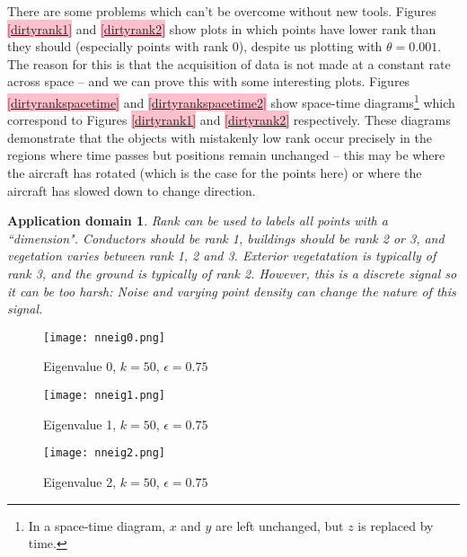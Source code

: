 \documentclass[a4paper,11pt,twoside]{article}
\newtheorem*{appdom}{Application domain}
\theoremstyle{definition}
\theoremstyle{remark}
\newcommand{\sh}[1]{\colorbox{pink}{#1}}
\newcommand{\lnk}[1]{\sh{\hyperref[#1]{\ref*{#1}}}}
\newenvironment{app}
   {\colorlet{shadecolor}{red!50}\begin{shaded}\begin{appdom}}
   {\end{appdom}\end{shaded}}
\begin{document}
There are some problems which can't be overcome without new tools. Figures \lnk{dirtyrank1} and \lnk{dirtyrank2} show plots in which points have lower rank than they should (especially points with rank $0$), despite us plotting with $\theta =0.001$. The reason for this is that the acquisition of data is not made at a constant rate across space -- and we can prove this with some interesting plots. Figures \lnk{dirtyrankspacetime} and \lnk{dirtyrankspacetime2} show space-time diagrams\footnote{In a space-time diagram, $x$ and $y$ are left unchanged, but $z$ is replaced by time.} which correspond to Figures \lnk{dirtyrank1} and \lnk{dirtyrank2} respectively. These diagrams demonstrate that the objects with mistakenly low rank occur precisely in the regions where time passes but positions remain unchanged -- this may be where the aircraft has rotated (which is the case for the points here) or where the aircraft has slowed down to change direction.
\begin{app}Rank can be used to labels all points with a ``dimension". Conductors should be rank 1, buildings should be rank 2 or 3, and vegetation varies between rank 1, 2 and 3. Exterior vegetatation is typically of rank 3, and the ground is typically of rank 2. However, this is a discrete signal so it can be too harsh: Noise and varying point density can change the nature of this signal.
\end{app}
\newpage
\begin{figure}[!h]
  \caption{Eigenvalue 0, $k=50$, $\epsilon = 0.75$}
  \centering
    \texttt{[image: nneig0.png]}
    \label{nneig0}
\end{figure}
\begin{figure}[!h]
  \caption{Eigenvalue 1, $k=50$, $\epsilon = 0.75$}
  \centering
    \texttt{[image: nneig1.png]}
    \label{nneig1}
\end{figure}
\newpage
\begin{figure}[!h]
  \caption{Eigenvalue 2, $k=50$, $\epsilon = 0.75$}
  \centering
    \texttt{[image: nneig2.png]}
    \label{nneig2}
\end{figure}
\end{document}
